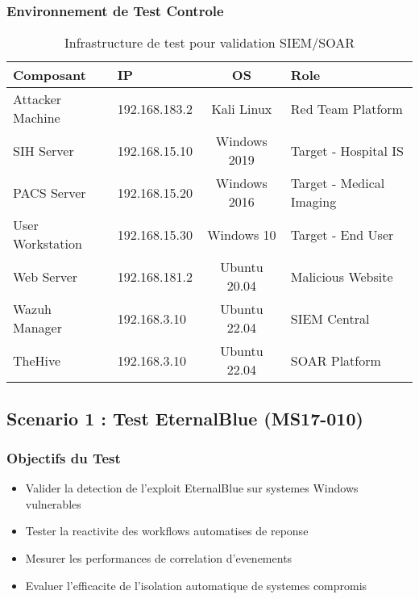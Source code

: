 \subsubsection{Environnement de Test Controle}

\begin{table}[H]
    \centering
    \caption{Infrastructure de test pour validation SIEM/SOAR}
    \begin{tabular}{|l|l|c|l|}
        \hline
        \textbf{Composant} & \textbf{IP}   & \textbf{OS}  & \textbf{Role}            \\
        \hline
        Attacker Machine   & 192.168.183.2 & Kali Linux   & Red Team Platform        \\
        \hline
        SIH Server         & 192.168.15.10 & Windows 2019 & Target - Hospital IS     \\
        \hline
        PACS Server        & 192.168.15.20 & Windows 2016 & Target - Medical Imaging \\
        \hline
        User Workstation   & 192.168.15.30 & Windows 10   & Target - End User        \\
        \hline
        Web Server         & 192.168.181.2 & Ubuntu 20.04 & Malicious Website        \\
        \hline
        Wazuh Manager      & 192.168.3.10  & Ubuntu 22.04 & SIEM Central             \\
        \hline
        TheHive            & 192.168.3.10  & Ubuntu 22.04 & SOAR Platform            \\
        \hline
    \end{tabular}
\end{table}

\subsection{Scenario 1 : Test EternalBlue (MS17-010)}

\subsubsection{Objectifs du Test}

\begin{itemize}
    \item Valider la detection de l'exploit EternalBlue sur systemes Windows vulnerables
    \item Tester la reactivite des workflows automatises de reponse
    \item Mesurer les performances de correlation d{'}evenements
    \item Evaluer l'efficacite de l'isolation automatique de systemes compromis
\end{itemize}


